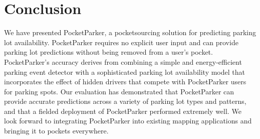 \section{Conclusion}
\label{sec-conclusions}

We have presented PocketParker, a pocketsourcing solution for predicting
parking lot availability. PocketParker requires no explicit user input and
can provide parking lot predictions without being removed from a user's
pocket. PocketParker's accuracy derives from combining a simple and
energy-efficient parking event detector with a sophisticated parking lot
availability model that incorporates the effect of hidden drivers that
compete with PocketParker users for parking spots. Our evaluation has
demonstrated that PocketParker can provide accurate predictions across a
variety of parking lot types and patterns, and that a fielded deployment of
PocketParker performed extremely well. We look forward to integrating
PocketParker into existing mapping applications and bringing it to pockets
everywhere.
